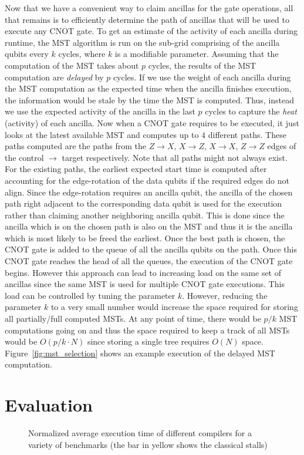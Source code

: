 Now that we have a convenient way to claim ancillas for the gate operations, all that remains is to efficiently determine the path of ancillas that will be used to execute any CNOT gate. To get an estimate of the activity of each ancilla during runtime, the MST algorithm is run on the sub-grid comprising of the ancilla qubits every $k$ cycles, where $k$ is a modifiable parameter. Assuming that the computation of the MST takes about $p$ cycles, the results of the MST computation are \textit{delayed} by $p$ cycles. If we use the weight of each ancilla during the MST computation as the expected time when the ancilla finishes execution, the information would be stale by the time the MST is computed. Thus, instead we use the expected activity of the ancilla in the last $p$ cycles to capture the \textit{heat} (activity) of each ancilla. Now when a CNOT gate requires to be executed, it just looks at the latest available MST and computes up to $4$ different paths. These paths computed are the paths from the $Z\to X$, $X\to Z$, $X\to X$, $Z\to Z$ edges of the control $\to$ target respectively. Note that all paths might not always exist. For the existing paths, the earliest expected start time is computed after accounting for the edge-rotation of the data qubits if the required edges do not align. Since the edge-rotation requires an ancilla qubit, the ancilla of the chosen path right adjacent to the corresponding data qubit is used for the execution rather than claiming another neighboring ancilla qubit. This is done since the ancilla which is on the chosen path is also on the MST and thus it is the ancilla which is most likely to be freed the earliest. Once the best path is chosen, the CNOT gate is added to the queue of all the ancilla qubits on the path. Once this CNOT gate reaches the head of all the queues, the execution of the CNOT gate begins. However this approach can lead to increasing load on the same set of ancillas since the same MST is used for multiple CNOT gate executions. This load can be controlled by tuning the parameter $k$. However, reducing the parameter $k$ to a very small number would increase the space required for storing all partially/full computed MSTs. At any point of time, there would be $p/k$ MST computations going on and thus the space required to keep a track of all MSTs would be $O(p/k\cdot N)$ since storing a single tree requires $O(N)$ space. Figure~\ref{fig:mst_selection} shows an example execution of the delayed MST computation.

\section{Evaluation}
\begin{figure}
    \centering
    
    \caption{Normalized average execution time of different compilers for a variety of benchmarks (the bar in yellow shows the classical stalls)}
    \label{fig:plot}
\end{figure}

